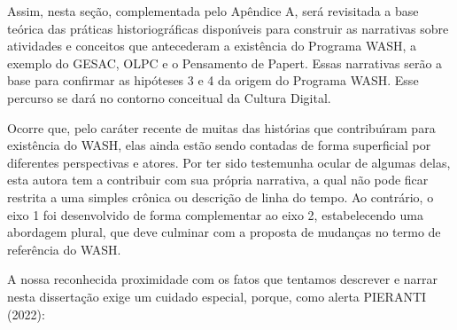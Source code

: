\documentclass[
12pt,		%
openright,	%
twoside,  %
a4paper,			%
chapter=TITLE,		%
english,			%
french,				%
spanish,			%
brazil				%
]{USPSC-classe/USPSC}
\begin{document}
Assim, nesta se\c{c}\~ao, complementada pelo Ap\^endice A, ser\'a revisitada a base te\'orica das pr\'aticas historiogr\'aficas dispon\'{\i}veis para construir as narrativas sobre atividades e conceitos que antecederam a exist\^encia do Programa WASH, a exemplo do GESAC, OLPC e o Pensamento de Papert. Essas narrativas ser\~ao a base para  confirmar as hip\'oteses 3 e 4  da origem do Programa WASH. Esse percurso se dar\'a no contorno conceitual da Cultura Digital.



































Ocorre que, pelo car\'ater recente de muitas das hist\'orias que contribu\'{\i}ram para exist\^encia do WASH, elas ainda est\~ao sendo contadas de forma superficial por diferentes perspectivas e atores. Por ter sido testemunha ocular de algumas delas, esta autora tem a contribuir com sua pr\'opria narrativa, a qual n\~ao pode ficar restrita a uma simples cr\^onica ou descri\c{c}\~ao de linha do tempo. Ao contr\'ario, o eixo 1 foi desenvolvido de forma complementar ao eixo 2, estabelecendo uma abordagem plural, que deve culminar com a proposta de mudan\c{c}as no termo de refer\^encia do WASH.

















A nossa reconhecida proximidade com os fatos que tentamos descrever e narrar nesta disserta\c{c}\~ao exige um cuidado especial, porque, como alerta  PIERANTI (2022):
\end{document}
